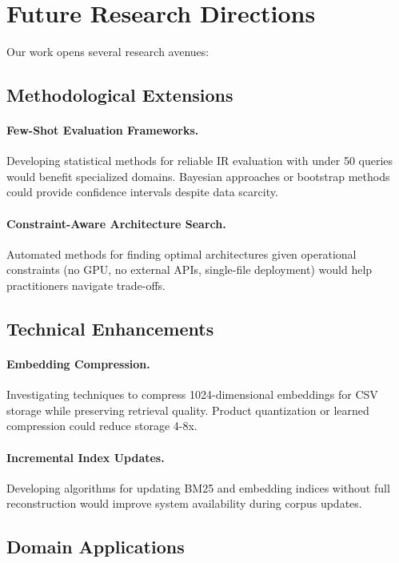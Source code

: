 \section{Future Research Directions}

Our work opens several research avenues:

\subsection{Methodological Extensions}

\paragraph{Few-Shot Evaluation Frameworks.} Developing statistical methods for reliable IR evaluation with under 50 queries would benefit specialized domains. Bayesian approaches or bootstrap methods could provide confidence intervals despite data scarcity.

\paragraph{Constraint-Aware Architecture Search.} Automated methods for finding optimal architectures given operational constraints (no GPU, no external APIs, single-file deployment) would help practitioners navigate trade-offs.

\subsection{Technical Enhancements}

\paragraph{Embedding Compression.} Investigating techniques to compress 1024-dimensional embeddings for CSV storage while preserving retrieval quality. Product quantization or learned compression could reduce storage 4-8x.

\paragraph{Incremental Index Updates.} Developing algorithms for updating BM25 and embedding indices without full reconstruction would improve system availability during corpus updates.

\subsection{Domain Applications}

